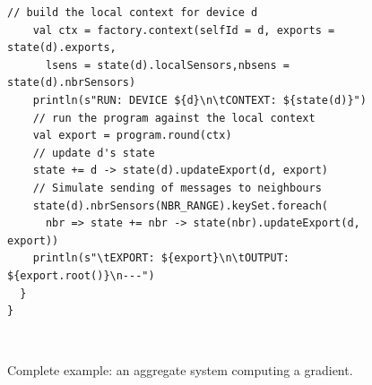 \begin{figure}
\begin{lrbox}{\exosystem}
\begin{lstlisting}[deletekeywords={[2]{nbr}},
emph={state}, basicstyle=\lst@ifdisplaystyle\footnotesize\fi\ttfamily]
    // build the local context for device d
    val ctx = factory.context(selfId = d, exports = state(d).exports,
      lsens = state(d).localSensors,nbsens = state(d).nbrSensors)
    println(s"RUN: DEVICE ${d}\n\tCONTEXT: ${state(d)}")
    // run the program against the local context
    val export = program.round(ctx)
    // update d's state
    state += d -> state(d).updateExport(d, export)
    // Simulate sending of messages to neighbours
    state(d).nbrSensors(NBR_RANGE).keySet.foreach(
      nbr => state += nbr -> state(nbr).updateExport(d, export))
    println(s"\tEXPORT: ${export}\n\tOUTPUT: ${export.root()}\n---")
  }
}
\end{lstlisting}
\end{lrbox}
\\
\caption{Complete example: an aggregate system computing a gradient.}
\label{fig:example-full}
\end{figure}
